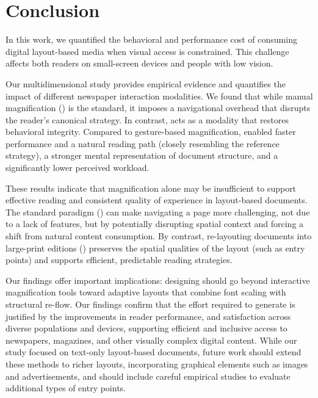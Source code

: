\section{Conclusion} 
\label{sec:conclusion}


In this work, we quantified the behavioral and performance cost of consuming digital layout-based media when visual access is constrained. This challenge affects both readers on small-screen devices and people with low vision.

Our multidimensional study provides empirical evidence 
and quantifies the impact of different newspaper interaction modalities. We found that while manual magnification (\condone) is the standard, it imposes a navigational overhead that disrupts the reader's canonical strategy. In contrast, \condtwo acts as a modality that restores behavioral integrity.
 Compared to gesture-based magnification, \condtwo enabled faster performance and a natural reading path (closely resembling the reference strategy), a stronger mental representation of document structure, and a significantly lower perceived workload.
 
These results indicate that magnification alone may be insufficient to support effective reading and consistent quality of experience in layout-based documents. The standard paradigm (\condone) can make navigating a page more challenging, not due to a lack of features, but by potentially disrupting spatial context and forcing a shift from natural content consumption. By contrast, re-layouting documents into large-print editions (\condtwo) preserves the spatial qualities of the layout (such as entry points) and supports efficient, predictable reading strategies.



Our findings offer important implications: designing  should go beyond interactive magnification tools toward adaptive layouts that combine font scaling with structural re-flow. Our findings confirm that the  effort required to generate \condtwo is justified  by the improvements in reader performance,  and satisfaction across diverse populations and devices, supporting efficient and inclusive access to newspapers, magazines, and other visually complex digital content. While our study focused on text-only layout-based documents, future work should extend these methods to richer layouts, incorporating graphical elements such as images and advertisements, and should include careful empirical studies to evaluate additional types of entry points.